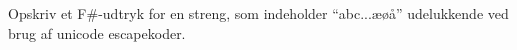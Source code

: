 Opskriv et F\#-udtryk for en streng, som indeholder ``abc...æøå'' udelukkende ved brug af unicode escapekoder.

